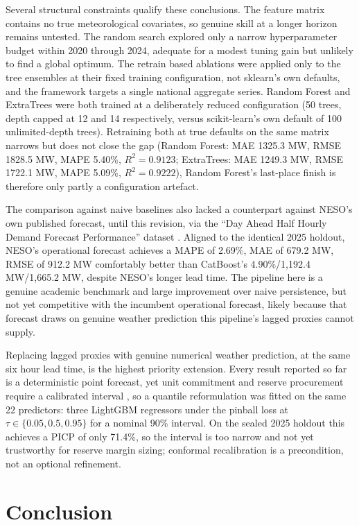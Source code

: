 \documentclass[runningheads]{llncs}
\begin{document}
Several structural constraints qualify these conclusions. The feature matrix contains no true meteorological covariates, so genuine skill at a longer horizon remains untested. The random search explored only a narrow hyperparameter budget within 2020 through 2024, adequate for a modest tuning gain but unlikely to find a global optimum. The retrain based ablations were applied only to the tree ensembles at their fixed training configuration, not sklearn's own defaults, and the framework targets a single national aggregate series. Random Forest and ExtraTrees were both trained at a deliberately reduced configuration (50 trees, depth capped at 12 and 14 respectively, versus scikit-learn's own default of 100 unlimited-depth trees). Retraining both at true defaults on the same matrix narrows but does not close the gap (Random Forest: MAE 1325.3 MW, RMSE 1828.5 MW, MAPE 5.40\%, $R^2=0.9123$; ExtraTrees: MAE 1249.3 MW, RMSE 1722.1 MW, MAPE 5.09\%, $R^2=0.9222$), Random Forest's last-place finish is therefore only partly a configuration artefact.

The comparison against naive baselines also lacked a counterpart against NESO's own published forecast, until this revision, via the ``Day Ahead Half Hourly Demand Forecast Performance'' dataset \cite{neso2026forecast}. Aligned to the identical 2025 holdout, NESO's operational forecast achieves a MAPE of 2.69\%, MAE of 679.2 MW, RMSE of 912.2 MW comfortably better than CatBoost's 4.90\%/1{,}192.4 MW/1{,}665.2 MW, despite NESO's longer lead time. The pipeline here is a genuine academic benchmark and large improvement over naive persistence, but not yet competitive with the incumbent operational forecast, likely because that forecast draws on genuine weather prediction this pipeline's lagged proxies cannot supply.

Replacing lagged proxies with genuine numerical weather prediction, at the same six hour lead time, is the highest priority extension. Every result reported so far is a deterministic point forecast, yet unit commitment and reserve procurement require a calibrated interval \cite{hong2016probabilistic}, so a quantile reformulation was fitted on the same 22 predictors: three LightGBM regressors under the pinball loss at $\tau \in \{0.05, 0.5, 0.95\}$ for a nominal 90\% interval. On the sealed 2025 holdout this achieves a PICP of only 71.4\%, so the interval is too narrow and not yet trustworthy for reserve margin sizing; conformal recalibration is a precondition, not an optional refinement.

\section{Conclusion}
\label{sec:conclusion}
\end{document}
